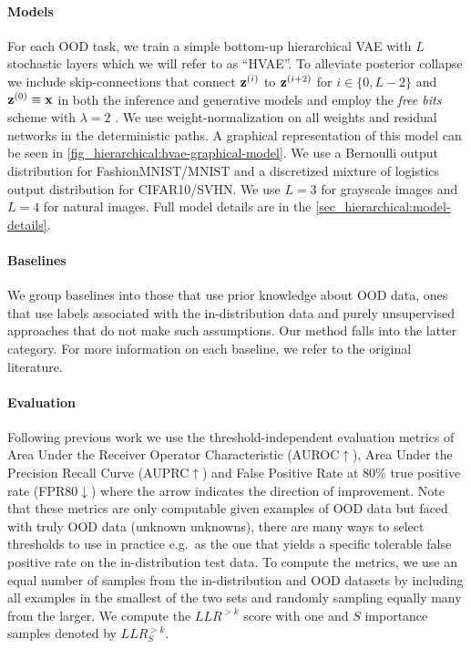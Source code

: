 {\paragraph{Models} For each OOD task, we train a simple bottom-up hierarchical VAE with $L$ stochastic layers which we will refer to as ``HVAE''.
To alleviate posterior collapse we include skip-connections that connect ${\mathbf{z}}^{(i)}$ to ${\mathbf{z}}^{(i+2)}$ for $i\in\{0, L-2\}$ and ${\mathbf{z}}^{(0)}\equiv{\mathbf{x}}$ in both the inference and generative models \parencite{dieng_avoiding_2019} and employ the \textit{free bits} scheme with $\lambda=2$ \parencite{kingma_improved_2016}.
We use weight-normalization \parencite{salimans_weight_2016} on all weights and residual networks in the deterministic paths. 
A graphical representation of this model can be seen in \cref{fig_hierarchical:hvae-graphical-model}.
We use a Bernoulli output distribution for FashionMNIST/MNIST and a discretized mixture of logistics output distribution \parencite{salimans_pixelcnn_2017} for CIFAR10/SVHN.
We use $L=3$ for grayscale images and $L=4$ for natural images.
Full model details are in the \cref{sec_hierarchical:model-details}.


\paragraph{Baselines} We group baselines into those that use prior knowledge about OOD data, ones that use labels associated with the in-distribution data and purely unsupervised approaches that do not make such assumptions.
Our method falls into the latter category.
For more information on each baseline, we refer to the original literature.


\paragraph{Evaluation} Following previous work \parencite{hendrycks_baseline_2017, hendrycks_deep_2019, alemi_uncertainty_2018, ren_likelihood_2019, choi_waic_2019} we use the threshold-independent evaluation metrics of Area Under the Receiver Operator Characteristic (AUROC$\uparrow$), Area Under the Precision Recall Curve (AUPRC$\uparrow$) and False Positive Rate at 80\% true positive rate (FPR80$\downarrow$) where the arrow indicates the direction of improvement.
Note that these metrics are only computable given examples of OOD data but faced with truly OOD data (unknown unknowns), there are many ways to select thresholds to use in practice e.g.\ as the one that yields a specific tolerable false positive rate on the in-distribution test data.
To compute the metrics, we use an equal number of samples from the in-distribution and OOD datasets by including all examples in the smallest of the two sets and randomly sampling equally many from the larger. We compute the $LLR^{>k}$ score with one and $S$ importance samples denoted by $LLR^{>k}_S$.

}
